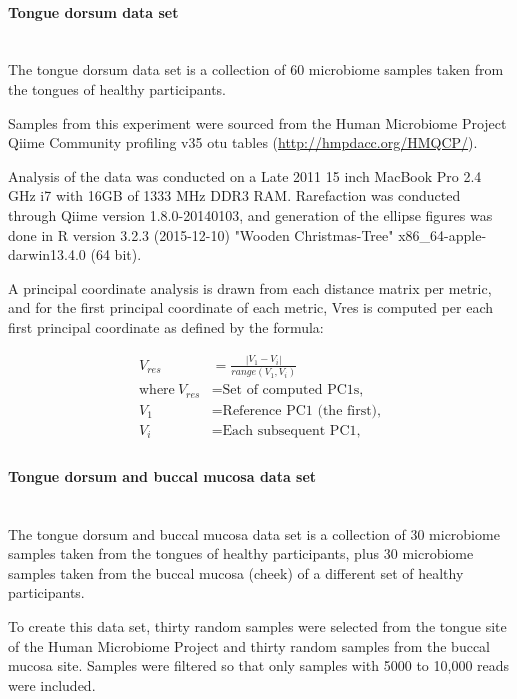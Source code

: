 \documentclass[10pt,letterpaper]{article}
\begin{document}
\paragraph{Tongue dorsum data set}\mbox{}\\
The tongue dorsum data set is a collection of 60 microbiome samples taken from the tongues of healthy participants.

Samples from this experiment were sourced from the Human Microbiome Project \cite{turnbaugh2007human} Qiime Community profiling v35 otu tables (\url{http://hmpdacc.org/HMQCP/}).

Analysis of the data was conducted on a Late 2011 15 inch MacBook Pro 2.4 GHz i7 with 16GB of 1333 MHz DDR3 RAM. Rarefaction was conducted through Qiime version 1.8.0-20140103, and generation of the ellipse figures was done in R version 3.2.3 (2015-12-10) "Wooden Christmas-Tree" x86\_64-apple-darwin13.4.0 (64 bit).

A principal coordinate analysis is drawn from each distance matrix per metric, and for the first principal coordinate of each metric, Vres is computed per each first principal coordinate as defined by the formula:

\begin{align*}
  V_{res} &=\frac{|V_1 - V_i|}{range(V_1, V_i)} \\
  \text{where}~V_{res}&= \text{Set of computed PC1s,} \\
  V_1 &= \text{Reference PC1 (the first),} \\
  V_i &= \text{Each subsequent PC1,} \\
\end{align*}

\paragraph{Tongue dorsum and buccal mucosa data set}\mbox{}\\
The tongue dorsum and buccal mucosa data set is a collection of 30 microbiome samples taken from the tongues of healthy participants, plus 30 microbiome samples taken from the buccal mucosa (cheek) of a different set of healthy participants.

To create this data set, thirty random samples were selected from the tongue site of the Human Microbiome Project \cite{turnbaugh2007human} and thirty random samples from the buccal mucosa site. Samples were filtered so that only samples with 5000 to 10,000 reads were included.
\end{document}
